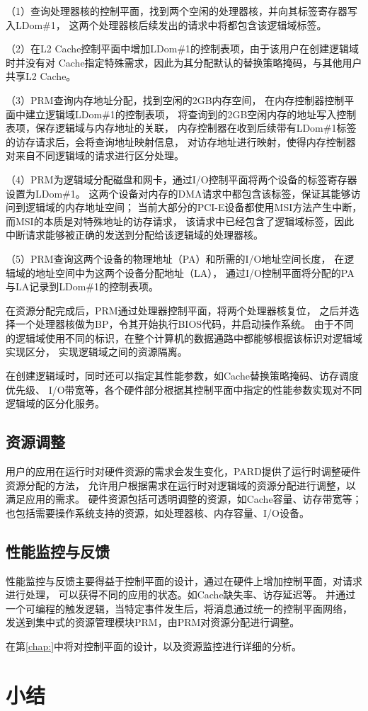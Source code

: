 （1）查询处理器核的控制平面，找到两个空闲的处理器核，并向其标签寄存器写入LDom\#1，
这两个处理器核后续发出的请求中将都包含该逻辑域标签。

（2）在L2 Cache控制平面中增加LDom\#1的控制表项，由于该用户在创建逻辑域时并没有对
Cache指定特殊需求，因此为其分配默认的替换策略掩码，与其他用户共享L2 Cache。

（3）PRM查询内存地址分配，找到空闲的2GB内存空间，
在内存控制器控制平面中建立逻辑域LDom\#1的控制表项，
将查询到的2GB空闲内存的地址写入控制表项，保存逻辑域与内存地址的关联，
内存控制器在收到后续带有LDom\#1标签的访存请求后，会将查询地址映射信息，
对访存地址进行映射，使得内存控制器对来自不同逻辑域的请求进行区分处理。

（4）PRM为逻辑域分配磁盘和网卡，通过I/O控制平面将两个设备的标签寄存器设置为LDom\#1。
这两个设备对内存的DMA请求中都包含该标签，保证其能够访问到逻辑域的内存地址空间；
当前大部分的PCI-E设备都使用MSI方法产生中断，而MSI的本质是对特殊地址的访存请求，
该请求中已经包含了逻辑域标签，因此中断请求能够被正确的发送到分配给该逻辑域的处理器核。

（5）PRM查询这两个设备的物理地址（PA）和所需的I/O地址空间长度，
在逻辑域的地址空间中为这两个设备分配地址（LA），
通过I/O控制平面将分配的PA与LA记录到LDom\#1的控制表项。

在资源分配完成后，PRM通过处理器控制平面，将两个处理器核复位，
之后并选择一个处理器核做为BP，令其开始执行BIOS代码，并启动操作系统。
由于不同的逻辑域使用不同的标识，在整个计算机的数据通路中都能够根据该标识对逻辑域实现区分，
实现逻辑域之间的资源隔离。

在创建逻辑域时，同时还可以指定其性能参数，如Cache替换策略掩码、访存调度优先级、
I/O带宽等，各个硬件部分根据其控制平面中指定的性能参数实现对不同逻辑域的区分化服务。


\subsection{资源调整}

用户的应用在运行时对硬件资源的需求会发生变化，PARD提供了运行时调整硬件资源分配的方法，
允许用户根据需求在运行时对逻辑域的资源分配进行调整，以满足应用的需求。
硬件资源包括可透明调整的资源，如Cache容量、访存带宽等；
也包括需要操作系统支持的资源，如处理器核、内存容量、I/O设备。




\subsection{性能监控与反馈}

性能监控与反馈主要得益于控制平面的设计，通过在硬件上增加控制平面，对请求进行处理，
可以获得不同的应用的状态。如Cache缺失率、访存延迟等。
并通过一个可编程的触发逻辑，当特定事件发生后，将消息通过统一的控制平面网络，
发送到集中式的资源管理模块PRM，由PRM对资源分配进行调整。

在第\ref{chap:}中将对控制平面的设计，以及资源监控进行详细的分析。


\section{小结}

